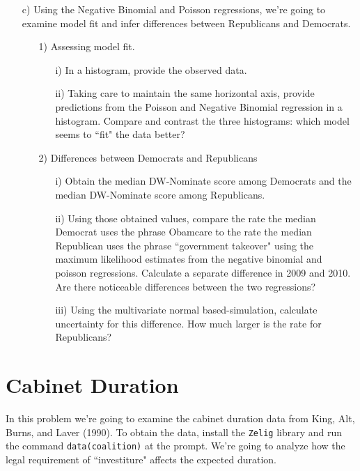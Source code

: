 \documentclass[letterpaper,12pt]{article}
\numberwithin{equation}{section}
\numberwithin{equation}{section}
\begin{document}
\begin{itemize}
\item[c)] Using the Negative Binomial and Poisson regressions, we're going to examine model fit and infer differences between Republicans and Democrats.
\begin{itemize}
\item[1)] Assessing model fit.
\begin{itemize}
\item[i)] In a histogram, provide the observed data.
\item[ii)] Taking care to maintain the same horizontal axis, provide predictions from the Poisson and Negative Binomial regression in a histogram.  Compare and contrast the three histograms: which model seems to ``fit" the data better?
\end{itemize}
\item[2)] Differences between Democrats and Republicans
\begin{itemize}
\item[i)] Obtain the median DW-Nominate score among Democrats and the median DW-Nominate score among Republicans.
\item[ii)] Using those obtained values, compare the rate the median Democrat uses the phrase Obamcare to the rate the median Republican uses the phrase ``government takeover" using the maximum likelihood estimates from the negative binomial and poisson regressions.  Calculate a separate difference in 2009 and 2010.  Are there noticeable differences between the two regressions?
\item[iii)] Using the multivariate normal based-simulation, calculate uncertainty for this difference.  How much larger is the rate for Republicans?
\end{itemize}
\end{itemize}
\end{itemize}


\section{Cabinet Duration}

In this problem we're going to examine the cabinet duration data from King, Alt, Burns, and Laver (1990).  To obtain the data, install the {\tt Zelig} library and run the command {\tt data(coalition)} at the prompt. We're going to analyze how the legal requirement of ``investiture" affects the expected duration.
\end{document}
